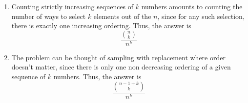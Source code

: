 \begin{enumerate}[label=(\alph*)]
\item Counting strictly increasing sequences of $k$ numbers amounts to counting 
the number of ways to select $k$ elements out of the $n$, since for any such 
selection, there is exactly one increasing ordering. Thus, the answer is 
$$\frac{\binom{n}{k}}{n^k}$$

\item The problem can be thought of sampling with replacement where order 
doesn't matter, since there is only one non decreasing ordering of a given 
sequence of $k$ numbers. Thus, the answer is
$$\frac{\binom{n-1+k}{k}}{n^k}$$

\end{enumerate}